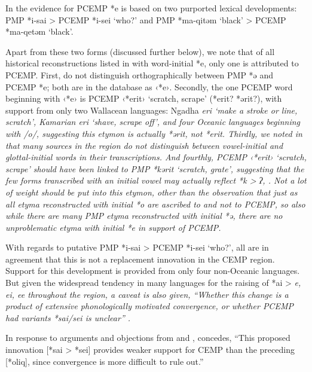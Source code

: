 In \citet[247--249]{Blust1993} the evidence for PCEMP *e is based on
two purported lexical developments: PMP *i-sai > PCEMP *i-sei
‘who?’ and PMP *ma-qitəm ‘black’ > PCEMP *ma-qetəm ‘black’.

Apart from these two forms (discussed further below),
we note that of all historical reconstructions listed in \citet{BlustTrussel2020}
with word-initial *e,
only one is attributed to PCEMP.
First, \citet{BlustTrussel2020} do not distinguish orthographically
between PMP *ə and PCEMP *e; both are in the database as ‹*e›.
Secondly, the one PCEMP word beginning with ‹*e› is PCEMP ‹*erit›
‘scratch, scrape’ (*erit? *ərit?), with support from only two Wallacean
languages: Ngadha \it{eri} ‘make a stroke or line,
scratch’, Kamarian \it{eri} ‘shave, scrape off’,
and four Oceanic languages beginning with /o/,
suggesting this etymon is actually *ərit, not *erit.
Thirdly, we noted in  that many sources in the
region do not distinguish between vowel-initial
and glottal-initial words in their transcriptions.
And fourthly, PCEMP ‹*erit› ‘scratch, scrape’ should have been
linked to PMP *kərit ‘scratch,
grate’, suggesting that the few forms transcribed with an initial
vowel may actually reflect *k > \it{ʔ}, {\0}.
Not a lot of weight should be put into this etymon,
other than the observation that just as all etyma reconstructed
with initial *o are ascribed to 
and not to PCEMP,
so also while there are many PMP etyma reconstructed with initial
*ə, there are no unproblematic etyma with initial *e in support of PCEMP.

With regards to putative PMP *i-sai > PCEMP *i-sei ‘who?’,
all are in agreement that this is not a replacement innovation
in the CEMP region.
Support for this development is provided from only four non-Oceanic languages.
But given the widespread tendency in many languages for the raising
of *ai > \it{e,
ei, ee} throughout the region,
a caveat is also given,
“Whether this change is a product of extensive phonologically
motivated convergence, or whether PCEMP had variants
*sai/sei is unclear” \citep[247f]{Blust1993}.

In response to arguments
and objections from \citet{Nothofer1992}
and \citet{DonohueGrimes2008}, \citet[54]{Blust2009} concedes,
“This proposed innovation [*sai > *sei] provides weaker support
for CEMP than the preceding [*oliq],
since convergence is more difficult to rule out.”

